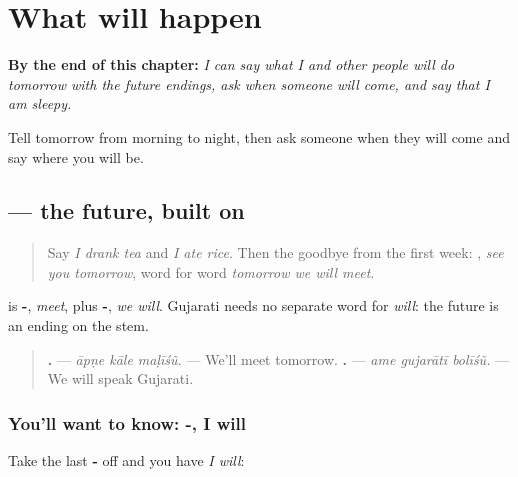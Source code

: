 
\chapter{What will happen}
\label{ch:gu-what-will-happen}

\begin{chapteropening}
\textbf{By the end of this chapter:} \emph{I can say what I and other people will do tomorrow with the future endings, ask when someone will come, and say that I am sleepy.}

Tell tomorrow from morning to night, then ask someone when they will come and say where you will be.
\end{chapteropening}

\section[\texorpdfstring{…\gu{ીશ} · …\gu{ીશું} (-īś · -īśũ)}{…ીશ · …ીશું (-īś · -īśũ)}]{  — the future, built on }

\label{lesson:GU-C149-bolish}



\begin{quote}
Say \emph{I drank tea} and \emph{I ate rice}. Then the goodbye from the first week: \textbf{ }, \emph{see you tomorrow}, word for word \emph{tomorrow we will meet}.
\end{quote}

\begin{grammarlens}[title={Grammar Lens: -\gu{ીશું}, we will}]
\textbf{} is \textbf{-}, \emph{meet}, plus \textbf{-}, \emph{we will}. Gujarati needs no separate word for \emph{will}: the future is an ending on the stem.

\begin{quote}
\textbf{  .} — \emph{āpṇe kāle maḷīśũ.} — We'll meet tomorrow. \textbf{  .} — \emph{ame gujarātī bolīśũ.} — We will speak Gujarati.
\end{quote}
\end{grammarlens}

\subsection*{You'll want to know: -, I will}
Take the last \textbf{-} off and you have \emph{I will}:

